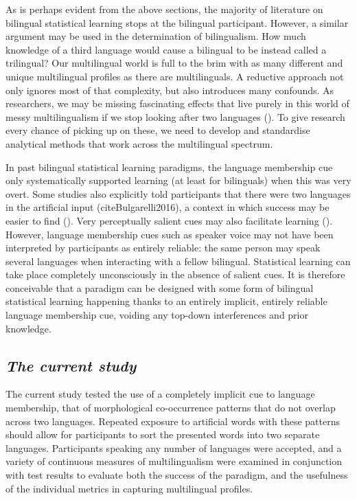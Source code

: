 As is perhaps evident from the above sections, the majority of literature on bilingual statistical learning stops at the bilingual participant. However, a similar argument may be used in the determination of bilingualism. How much knowledge of a third language would cause a bilingual to be instead called a trilingual? Our multilingual world is full to the brim with as many different and unique multilingual profiles as there are multilinguals. A reductive approach not only ignores most of that complexity, but also introduces many confounds. As researchers, we may be missing fascinating effects that live purely in this world of messy multilingualism if we stop looking after two languages (\cite{Bassetti2022}). To give research every chance of picking up on these, we need to develop and standardise analytical methods that work across the multilingual spectrum.

In past bilingual statistical learning paradigms, the language membership cue only systematically supported learning (at least for bilinguals) when this was very overt. Some studies also explicitly told participants that there were two languages in the artificial input (cite{Bulgarelli2016}), a context in which success may be easier to find (\cite{Gebhart2009}). Very perceptually salient cues may also facilitate learning (\cite{Weiss2009}). However, language membership cues such as speaker voice may not have been interpreted by participants as entirely reliable: the same person may speak several languages when interacting with a fellow bilingual. Statistical learning can take place completely unconsciously in the absence of salient cues. It is therefore conceivable that a paradigm can be designed with some form of bilingual statistical learning happening thanks to an entirely implicit, entirely reliable language membership cue, voiding any top-down interferences and prior knowledge.


\subsection{\large{\emph{The current study}}}
\label{CurrentStudy}
\noindent
The current study tested the use of a completely implicit cue to language membership, that of morphological co-occurrence patterns that do not overlap across two languages. Repeated exposure to artificial words with these patterns should allow for participants to sort the presented words into two separate languages. Participants speaking any number of languages were accepted, and a variety of continuous measures of multilingualism were examined in conjunction with test results to evaluate both the success of the paradigm, and the usefulness of the individual metrics in capturing multilingual profiles.


















